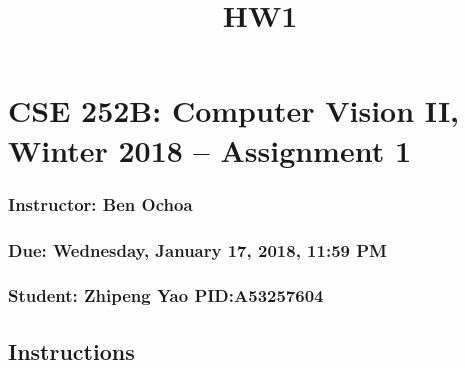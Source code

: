 \documentclass[11pt]{article}
\title{HW1}
\begin{document}
    
    
    \maketitle
    
    

    
    \hypertarget{cse-252b-computer-vision-ii-winter-2018-assignment-1}{%
\section{CSE 252B: Computer Vision II, Winter 2018 -- Assignment
1}\label{cse-252b-computer-vision-ii-winter-2018-assignment-1}}

\hypertarget{instructor-ben-ochoa}{%
\subsubsection{Instructor: Ben Ochoa}\label{instructor-ben-ochoa}}

\hypertarget{due-wednesday-january-17-2018-1159-pm}{%
\subsubsection{Due: Wednesday, January 17, 2018, 11:59
PM}\label{due-wednesday-january-17-2018-1159-pm}}

\hypertarget{student-zhipeng-yao-pida53257604}{%
\subsubsection{Student: Zhipeng Yao
PID:A53257604}\label{student-zhipeng-yao-pida53257604}}

    \hypertarget{instructions}{%
\subsection{Instructions}\label{instructions}}
\end{document}
